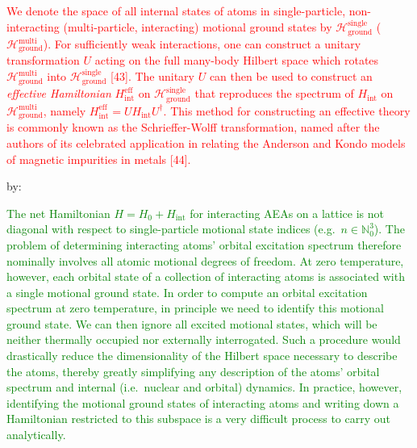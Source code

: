 \documentclass[preprint]{revtex4-1}
\renewcommand{\t}{\text} %
\renewcommand{\H}{\mathcal{H}}
\newcommand{\1}{\mathds{1}}
\newcommand{\red}[1]{\textcolor{red}{#1}}
\newcommand{\green}[1]{\textcolor{green}{#1}}
\newcounter{point}
\begin{document}
\begin{enumerate}[label=(R1.\arabic{point}.\arabic*)]
  \red{We denote the space of all internal states of atoms in
    single-particle, non-interacting (multi-particle, interacting)
    motional ground states by $\H_{\t{ground}}^{\t{single}}$
    ($\H_{\t{ground}}^{\t{multi}}$).  For sufficiently weak
    interactions, one can construct a unitary transformation $U$
    acting on the full many-body Hilbert space which rotates
    $\H_{\t{ground}}^{\t{multi}}$ into $\H_{\t{ground}}^{\t{single}}$
    [43].  The unitary $U$ can then be used to construct an {\it
      effective Hamiltonian} $H_{\t{int}}^{\t{eff}}$ on
    $\H_{\t{ground}}^{\t{single}}$ that reproduces the spectrum of
    $H_{\t{int}}$ on $\H_{\t{ground}}^{\t{multi}}$, namely
    $H_{\t{int}}^{\t{eff}}=UH_{\t{int}}U^\dag$.  This method for
    constructing an effective theory is commonly known as the
    Schrieffer-Wolff transformation, named after the authors of its
    celebrated application in relating the Anderson and Kondo models
    of magnetic impurities in metals [44].}

  by:

  \green{The net Hamiltonian $H = H_0 + H_{\t{int}}$ for interacting
    AEAs on a lattice is not diagonal with respect to single-particle
    motional state indices (e.g.~$n\in\mathbb{N}_0^3$).  The problem
    of determining interacting atoms' orbital excitation spectrum
    therefore nominally involves all atomic motional degrees of
    freedom.  At zero temperature, however, each orbital state of a
    collection of interacting atoms is associated with a single
    motional ground state.  In order to compute an orbital excitation
    spectrum at zero temperature, in principle we need to identify
    this motional ground state.  We can then ignore all excited
    motional states, which will be neither thermally occupied nor
    externally interrogated.  Such a procedure would drastically
    reduce the dimensionality of the Hilbert space necessary to
    describe the atoms, thereby greatly simplifying any description of
    the atoms' orbital spectrum and internal (i.e.~nuclear and
    orbital) dynamics.  In practice, however, identifying the motional
    ground states of interacting atoms and writing down a Hamiltonian
    restricted to this subspace is a very difficult process to carry
    out analytically.}


\end{enumerate}
\end{document}
